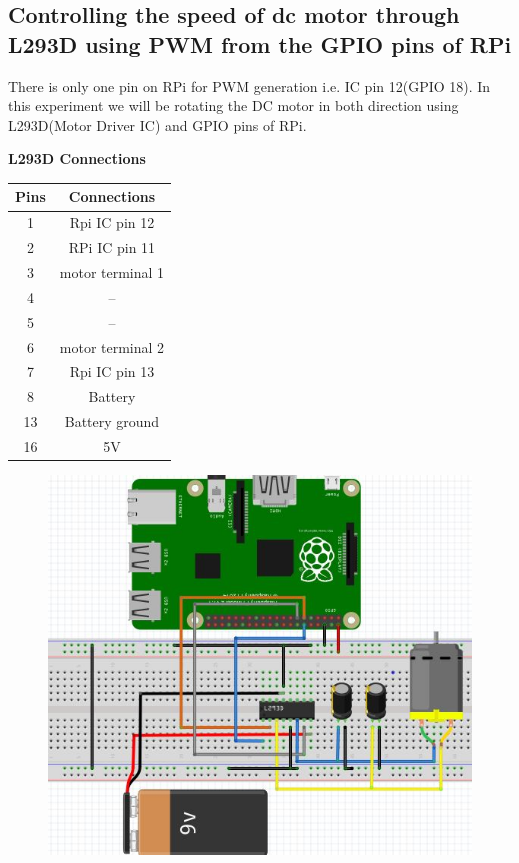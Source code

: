 \documentclass[11pt,a4paper]{article}
\begin{document}
	\subsection{Controlling the speed of dc motor through L293D using PWM from the GPIO pins of RPi}  
	There is only one pin on RPi for PWM generation i.e. IC pin 12(GPIO 18).
	In this experiment we will be rotating the DC motor in both direction using L293D(Motor Driver IC) and GPIO pins of RPi.
	 
	\textbf{L293D Connections}
	\begin{center}
		\begin{tabular}{|c|c|}
			\hline
		\textbf{Pins }  & \textbf{Connections}	 \\ \hline
			
			1 & Rpi IC pin 12  \\ \hline
			2 & RPi IC pin 11  \\ \hline
			3 & motor terminal 1    \\  \hline
			4 & --		\\   \hline
			5 & -- 	\\   \hline
			6 & motor terminal 2		\\  \hline
			7 & Rpi IC pin 13		\\   \hline
			8 & Battery			\\  \hline
			13 & Battery ground		\\   \hline
			16 & 5V				\\   \hline
			
		\end{tabular}
	\end{center} 
	\vspace{1cm}
	\begin{figure}[h!]
		\includegraphics[scale=0.6]{DC_motor_GPIO.jpg}
		\centering
	\end{figure}
\end{document}
